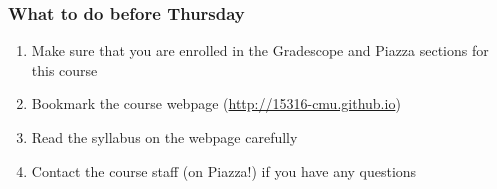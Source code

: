 \documentclass[10pt,handout]{beamer}
\begin{document}

\begin{frame}

\frametitle{What to do before Thursday}

\begin{enumerate}
  \item Make sure that you are enrolled in the Gradescope and Piazza sections for this course
  \item Bookmark the course webpage (\url{http://15316-cmu.github.io})
  \item Read the syllabus on the webpage carefully
  \item Contact the course staff (on Piazza!) if you have any questions
\end{enumerate}

\end{frame}
\end{document}
